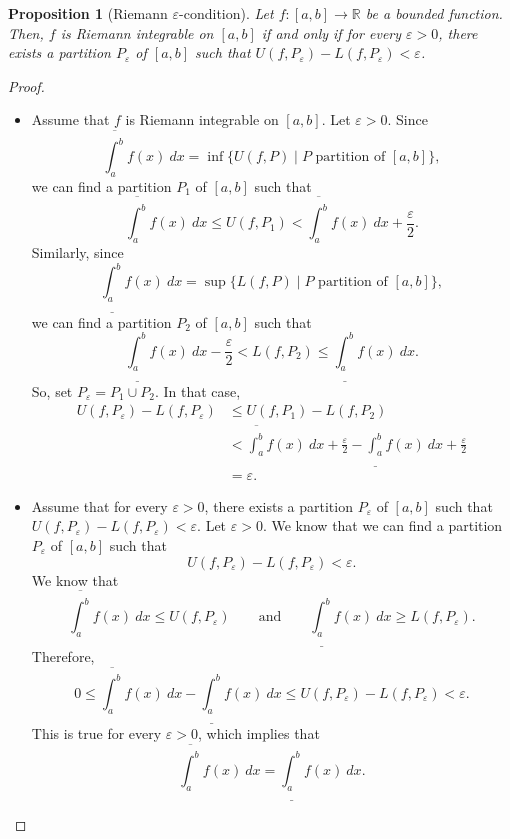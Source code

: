 \documentclass[a4paper, openany]{memoir}
\theoremstyle{definition}
\theoremstyle{plain}
\newtheorem{proposition}[definition]{Proposition}
\begin{document}
\begin{proposition}[Riemann $\varepsilon$-condition]
Let $f: [a, b] \to \mathbb{R}$ be a bounded function. Then, $f$ is Riemann integrable on $[a, b]$ if and only if for every $\varepsilon > 0$, there exists a partition $P_\varepsilon$ of $[a, b]$ such that $U(f, P_\varepsilon) - L(f, P_\varepsilon) < \varepsilon$.
\end{proposition}
\begin{proof}
\hspace*{0pt}
\begin{itemize}
    \item Assume that $f$ is Riemann integrable on $[a, b]$. Let $\varepsilon > 0$. Since
    \[\overline{\int_a^b} f(x) \ dx = \inf \{U(f, P) \mid P \text{ partition of } [a, b]\},\]
    we can find a partition $P_1$ of $[a, b]$ such that 
    \[\overline{\int_a^b} f(x) \ dx \leqslant U(f, P_1) < \overline{\int_a^b} f(x) \ dx + \frac{\varepsilon}{2}.\]
    Similarly, since
    \[\underline{\int_a^b} f(x) \ dx = \sup \{L(f, P) \mid P \text{ partition of } [a, b]\},\]
    we can find a partition $P_2$ of $[a, b]$ such that
    \[\underline{\int_a^b} f(x) \ dx - \frac{\varepsilon}{2} < L(f, P_2) \leqslant \underline{\int_a^b} f(x) \ dx.\]
    So, set $P_\varepsilon = P_1 \cup P_2$. In that case,
    \begin{align*}
        U(f, P_\varepsilon) - L(f, P_\varepsilon) &\leqslant U(f, P_1) - L(f, P_2) \\
        &< \overline{\int_a^b} f(x) \ dx + \frac{\varepsilon}{2} - \underline{\int_a^b} f(x) \ dx + \frac{\varepsilon}{2} \\
        &= \varepsilon.
    \end{align*}
    
    \item Assume that for every $\varepsilon > 0$, there exists a partition $P_\varepsilon$ of $[a, b]$ such that $U(f, P_\varepsilon) - L(f, P_\varepsilon) < \varepsilon$. Let $\varepsilon > 0$. We know that we can find a partition $P_\varepsilon$ of $[a, b]$ such that
    \[U(f, P_\varepsilon) - L(f, P_\varepsilon) < \varepsilon.\]
    We know that
    \[\overline{\int_a^b} f(x) \ dx \leqslant U(f, P_\varepsilon) \qquad \text{and} \qquad \underline{\int_a^b} f(x) \ dx \geqslant L(f, P_\varepsilon).\]
    Therefore,
    \[0 \leqslant \overline{\int_a^b} f(x) \ dx - \underline{\int_a^b} f(x) \ dx \leqslant U(f, P_\varepsilon) - L(f, P_\varepsilon) < \varepsilon.\]
    This is true for every $\varepsilon > 0$, which implies that
    \[\overline{\int_a^b} f(x) \ dx = \underline{\int_a^b} f(x) \ dx.\]
\end{itemize}
\end{proof}
\end{document}
